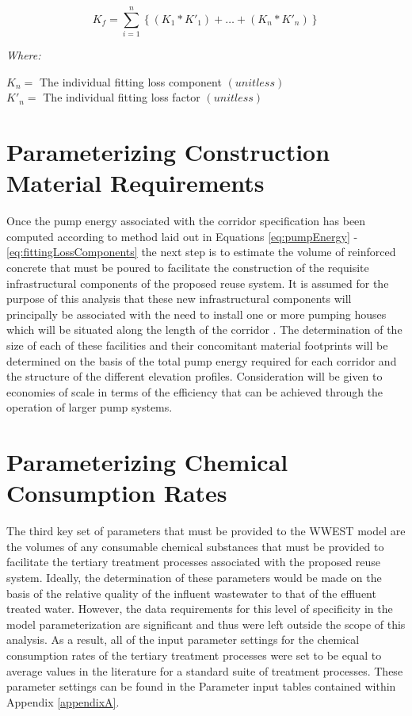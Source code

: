         \begin{equation}
            K_f = \sum\limits_{i=1}^n \left\{ (K_1 * K'_1) + \dots + (K_n * K'_n) \right\}
            \label{eq:fittingLossComponents}
        \end{equation}
    
       \noindent \textit{Where:} \hfill
       
       \begin{center}
           $K_n = $ The individual fitting loss component $(unitless)$ \\
           $K'_n = $ The individual fitting loss factor $(unitless)$ \\
       \end{center}
       
\section{Parameterizing Construction Material Requirements}

Once the pump energy associated with the corridor specification has been computed according to method laid out in Equations \ref{eq:pumpEnergy} - \ref{eq:fittingLossComponents} the next step is to estimate the volume of reinforced concrete that must be poured to facilitate the construction of the requisite infrastructural components of the proposed reuse system. It is assumed for the purpose of this analysis that these new infrastructural components will principally be associated with the need to install one or more pumping houses which will be situated along the length of the corridor \cite{Liu2003}. The determination of the size of each of these facilities and their concomitant material footprints will be determined on the basis of the total pump energy required for each corridor and the structure of the different elevation profiles. Consideration will be given to economies of scale in terms of the efficiency that can be achieved through the operation of larger pump systems.  
       
\section{Parameterizing Chemical Consumption Rates} 

The third key set of parameters that must be provided to the WWEST model are the volumes of any consumable chemical substances that must be provided to facilitate the tertiary treatment processes associated with the proposed reuse system. Ideally, the determination of these parameters would be made on the basis of the relative quality of the influent wastewater to that of the effluent treated water. However, the data requirements for this level of specificity in the model parameterization are significant and thus were left outside the scope of this analysis. As a result, all of the input parameter settings for the chemical consumption rates of the tertiary treatment processes were set to be equal to average values in the literature for a standard suite of treatment processes. These parameter settings can be found in the Parameter input tables contained within Appendix \ref{appendixA}.

